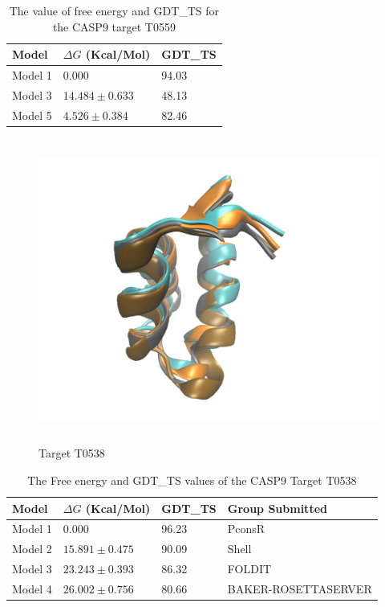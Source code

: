 \documentclass[12pt]{article}
\begin{document}
\begin{table}
\caption{The value of free energy and GDT\_TS for the CASP9 target T0559}
\label{tab:T0559}
\begin{center}
\begin{tabular}{l l l}\hline
Model   &     $\Delta G$ (Kcal/Mol) &  GDT\_TS \\ \hline
Model 1 &     0.000            &  94.03    \\
Model 3 &     $14.484 \pm 0.633$ &  48.13    \\         
Model 5 &     $4.526  \pm 0.384$ &  82.46    \\ \hline
\end{tabular}
\end{center}
\end{table}

\begin{figure}
\begin{center}
\includegraphics[width=12cm,height=10cm]{T0538.pdf}
\end{center}
\caption{Target T0538}
\label{fig:T0538}
\end{figure}

\begin{table}
\caption{The Free energy and GDT\_TS values of the CASP9 Target T0538}
\label{tab:T0538}
\begin{center}
\begin{tabular}{l l l l}\hline
Model   &     $\Delta G$ (Kcal/Mol) &  GDT\_TS & Group Submitted \\ \hline
Model 1 &     0.000              &  96.23    & PconsR  \\ 
Model 2 &     $15.891 \pm 0.475$ &  90.09  & Shell  \\ 
Model 3 &     $23.243 \pm 0.393$ &  86.32  & FOLDIT  \\ 
Model 4 &     $26.002 \pm 0.756$ &  80.66  & BAKER-ROSETTASERVER \\ \hline
\end{tabular}
\end{center}
\end{table}
\end{document}
